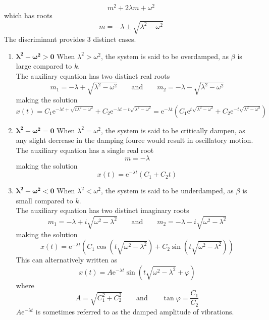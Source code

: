 \documentclass[12pt]{article}
\newcommand{\en}{\text{e}}
\begin{document}
\begin{enumerate}
        \[m^2 + 2\lambda m + \omega^2\]
        which has roots
        \[m = -\lambda \pm \sqrt{\lambda^2 - \omega^2}\]
        The discriminant provides 3 distinct cases.
      \begin{enumerate}
        \item \(\bm{\lambda^2 - \omega^2 > 0}\) 
          When \(\lambda^2 > \omega^2\), the system is said to be overdamped, as \(\beta\) is large compared to \(k\). \\
          The auxiliary equation has two distinct real roots
            \[
              m_1 = -\lambda + \sqrt{\lambda^2 - \omega^2} \qquad \text{and} \qquad
              m_2 = -\lambda - \sqrt{\lambda^2 - \omega^2}
            \]
            making the solution
            \[
              x(t) = C_1\en^{-\lambda t + \sqrt{t\lambda^2 - \omega^2}} + C_2\en^{-\lambda t - t\sqrt{\lambda^2 - \omega^2}}
                = \en^{-\lambda t}\left(C_1\en^{t\sqrt{\lambda^2 - \omega^2}} + C_2\en^{-t\sqrt{\lambda^2 - \omega^2}}\right)
            \]
        \item \(\bm{\lambda^2 - \omega^2 = 0}\)
          When \(\lambda^2 = \omega^2\), the system is said to be critically dampen, as any slight decrease in the damping fource would result in oscillatory motion. \\
          The auxiliary equation has a single real root
            \[m = -\lambda\]
            making the solution
            \[x(t) = \en^{-\lambda t}\left(C_1 + C_2 t\right)\]
        \item \(\bm{\lambda^2 - \omega^2 < 0}\)
          When \(\lambda^2 < \omega^2\), the system is said to be underdamped, as \(\beta\) is small compared to \(k\). \\
          The auxiliary equation has two distinct imaginary roots
            \[
              m_1 = -\lambda + i\sqrt{\omega^2 - \lambda^2} \qquad \text{and} \qquad
              m_2 = -\lambda - i\sqrt{\omega^2 - \lambda^2}
            \]
            making the solution
            \[
              x(t) = \en^{-\lambda t}\left(C_1\cos\left(t\sqrt{\omega^2 - \lambda^2}\right) + C_2\sin\left(t\sqrt{\omega^2 - \lambda^2}\right)\right)
            \]
            This can alternatively written as
            \[x(t) = A\en^{-\lambda t}\sin\left(t\sqrt{\omega^2 - \lambda^2} + \varphi\right)\]
            where
            \[
            	A = \sqrt{C_1^2 + C_2^2} \qquad \text{and} \qquad
            	\tan\varphi = \frac{C_1}{C_2}
            \]
            \(A\en^{-\lambda t}\) is sometimes referred to as the damped amplitude of vibrations. \\

\end{enumerate}
\end{enumerate}
\end{document}

